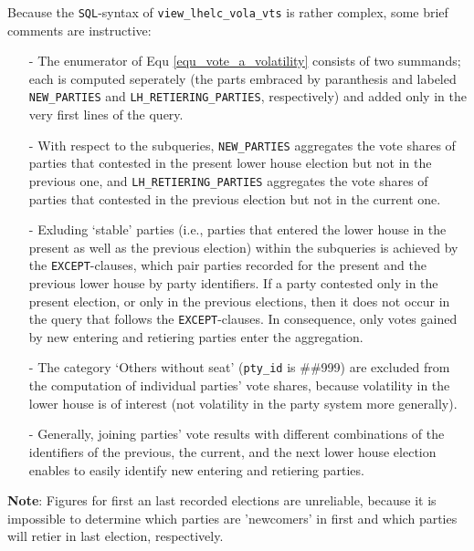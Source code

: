 Because the \texttt{\footnotesize SQL}-syntax of \texttt{\footnotesize view\_lhelc\_vola\_vts} is rather complex, some brief comments are instructive:
\begin{itemize}
\item[-]{The enumerator of Equ \ref{equ_vote_a_volatility} consists of two summands; each is computed seperately (the parts embraced by paranthesis and labeled \texttt{\footnotesize NEW\_PARTIES} and \texttt{\footnotesize LH\_RETIERING\_PARTIES}, respectively) and added only in the very first lines of the query.}
\item[-]{With respect to the subqueries, 
\texttt{\footnotesize NEW\_PARTIES} aggregates the vote shares of parties that contested in the present lower house election but not in the previous one, and 
 \texttt{\footnotesize LH\_RETIERING\_PARTIES} aggregates the vote shares of parties that contested in the previous election but not in the current one.}
\item[-]{Exluding `stable' parties (i.e., parties that entered the lower house in the present as well as the previous election) within the subqueries is achieved by the \texttt{\footnotesize EXCEPT}-clauses, which pair parties recorded for the present and the previous lower house by party identifiers. If a party contested only in the present election, or only in the previous elections, then it does not occur in the query that follows the \texttt{\footnotesize EXCEPT}-clauses. In consequence, only votes gained by new entering and retiering parties enter the aggregation.}
\item[-]{The category `Others without seat' (\texttt{\footnotesize pty\_id} is \#\#999) are excluded from the computation of individual parties' vote shares, because volatility in the lower house is of interest (not volatility in the party system more generally).}
\item[-]{Generally, joining parties' vote results with different combinations of the identifiers of the previous, the current, and the next lower house election enables to easily identify new entering and retiering parties.}
\end{itemize}

{\bf Note}:	Figures for first an last recorded elections are unreliable, because it is impossible to determine which parties are 'newcomers' in first and which parties will retier in last election, respectively. 



